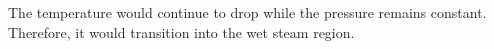 The temperature would continue to drop while the pressure remains constant. Therefore, it would transition into the wet steam region.
